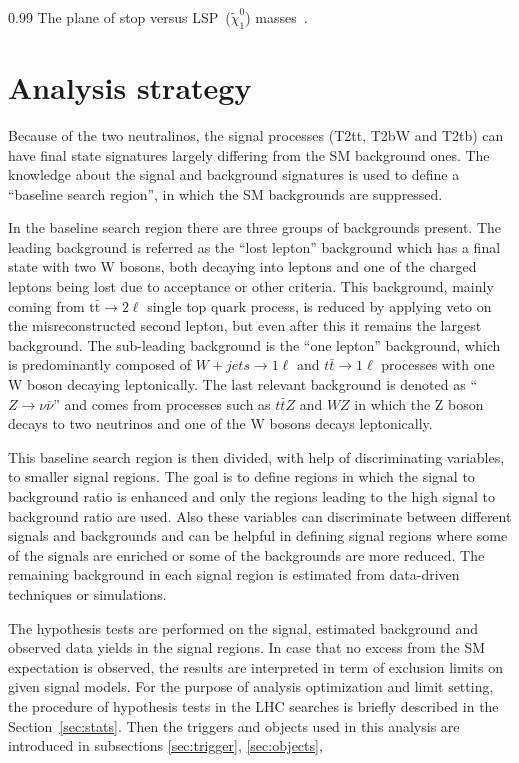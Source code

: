                  {0.99}       %
                 { The plane of stop versus LSP~($\tilde{\chi}^{0}_{1}$) masses~\cite{Aad:2014kra}. }


\section{Analysis strategy}

Because of the two neutralinos, the signal processes (T2tt, T2bW and T2tb)  can have final state signatures largely differing from the SM background ones. The knowledge about the signal and background signatures is used to define a ``baseline search region'', in which the SM backgrounds are suppressed. 

In the baseline search region there are three groups of backgrounds present. The leading background is referred as the ``lost lepton'' background which has a final state with two W bosons, both decaying into leptons and one of the charged leptons being lost due to acceptance or other criteria. This background, mainly coming from $\mathrm{t\bar{t}} \to 2 \ell$ single top quark process,  is reduced by applying veto on the misreconstructed second lepton, but even after this it remains the largest background. The sub-leading background is the ``one lepton'' background, which is predominantly composed of $W+jets \to 1\ell$ and $t\bar{t} \to 1 \ell$ processes with one W boson decaying leptonically. The last relevant background is denoted as ``$Z \to \nu \bar{\nu}$'' and comes from processes such as $t\bar{t}Z$ and $WZ$ in which the Z boson decays to two neutrinos and one of the W bosons decays leptonically.  

This baseline search region is then divided,  with help of discriminating variables, to smaller signal regions. The goal is to define regions in which the signal to background ratio is enhanced and only the regions leading to the high signal to background ratio are used. Also these variables can discriminate between different signals and backgrounds and can be helpful in defining signal regions where some of the signals are enriched or some of the backgrounds are more reduced. The remaining background in each signal region is estimated from data-driven techniques or simulations. 

The hypothesis tests are performed on the signal, estimated background and observed data yields in the signal regions. In case that no excess from the SM expectation is observed, the results are interpreted in term of exclusion limits on given signal models. For the purpose of analysis optimization and limit setting, the procedure of hypothesis tests in the LHC searches is briefly described in the Section~\ref{sec:stats}. Then the triggers and objects used in this analysis are introduced in subsections \ref{sec:trigger}, \ref{sec:objects},
 
